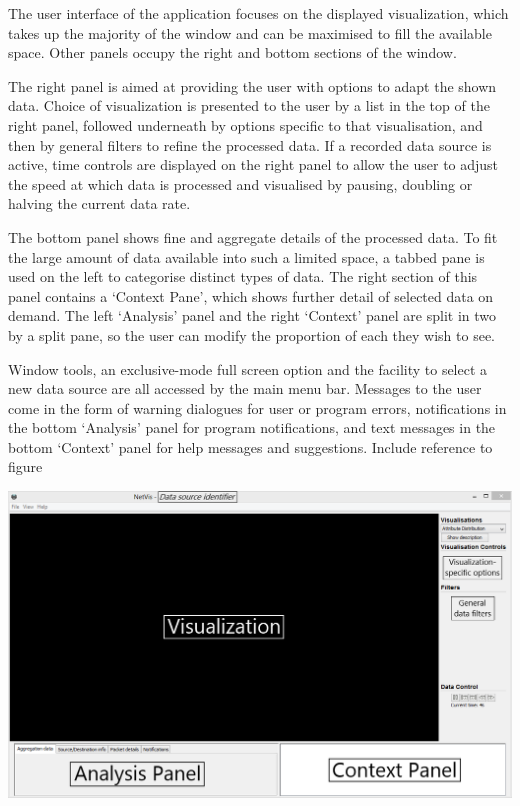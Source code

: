 
The user interface of the application focuses on the displayed
visualization, which takes up the majority of the window and can be maximised
to fill the available space. Other panels occupy the right and bottom sections
of the window.

The right panel is aimed at providing the user with options to adapt the shown data.
Choice of visualization is presented to the user by a list in the top of the
right panel, followed underneath by options specific to that visualisation, and
then by general filters to refine the processed data. If a recorded data source
is active, time controls are displayed on the right panel to allow the user to
adjust the speed at which data is processed and visualised by pausing,
doubling or halving the current data rate. 

The bottom panel shows fine and aggregate details of the
processed data. To fit the large amount of data available into such a limited
space, a tabbed pane is used on the left to categorise distinct types of data.
The right section of this panel contains a `Context Pane', which shows further detail of selected data on demand. The left
`Analysis' panel and the right `Context' panel are split in two by a split
pane, so the user can modify the proportion of each they wish to see.


Window tools, an exclusive-mode full screen option and the facility to select
a new data source are all accessed by the main menu bar. Messages to the user
come in the form of warning dialogues for user or program errors, notifications
in the bottom `Analysis' panel for program notifications, and text messages in
the bottom `Context' panel for help messages and suggestions. {\color{red} Include reference to figure}


\includegraphics[width=\linewidth]{materials/layout-diagram.png}
